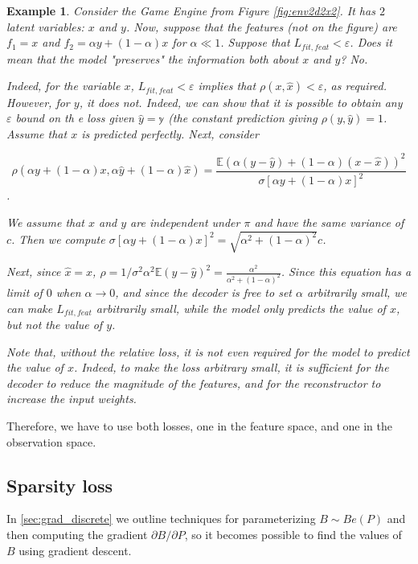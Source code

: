 \documentclass[a4paper,11pt,oneside]{report}
\newtheorem{example}{Example}[section]
\begin{document}
\begin{example}
Consider the Game Engine from Figure \ref{fig:env2d2x2}. It has $2$ latent variables: $x$ and $y$. Now, suppose that the features (not on the figure) are $f_1=x$ and $f_2=\alpha y+(1-\alpha)x$ for $\alpha \ll 1$. Suppose that $L_{fit, feat}<\varepsilon$. Does it mean that the model "preserves" the information both about $x$ and $y$? No.

Indeed, for the variable $x$, $L_{fit, feat}<\varepsilon$ implies that $\rho(x,\hat{x})<\varepsilon$, as required. However, for $y$, it does not. Indeed, we can show that it is possible to obtain any $\varepsilon$ bound on th e loss given $\hat{y}=\mathbb y$ (the constant prediction giving $\rho(y,\hat{y})=1$. Assume that $x$ is predicted perfectly. Next, consider

$$\rho(\alpha y+(1-\alpha)x,\alpha \hat{y}+(1-\alpha)\hat{x})=\frac{\mathbb E \left(\alpha(y-\hat{y})+(1-\alpha)(x-\hat{x})\right)^2}{\sigma[\alpha y+(1-\alpha)x]^2}$$.

We assume that $x$ and $y$ are independent under $\pi$ and have the same variance of $c$. Then we compute $\sigma[\alpha y+(1-\alpha)x]^2=\sqrt{\alpha^2+(1-\alpha)^2}c$.

Next, since $\hat{x}=x$, $\rho=1/\sigma^2\alpha^2\mathbb E(y-\hat{y})^2=\frac{\alpha^2}{\alpha^2+(1-\alpha)^2}$. Since this equation has a limit of $0$ when $\alpha\to 0$, and since the decoder is free to set $\alpha$ arbitrarily small, we can make $L_{fit, feat}$ arbitrarily small, while the model only predicts the value of $x$, but not the value of $y$.

Note that, without the relative loss, it is not even required for the model to predict the value of $x$. Indeed, to make the loss arbitrary small, it is sufficient for the decoder to reduce the magnitude of the features, and for the reconstructor to increase the input weights.
\end{example}

Therefore, we have to use both losses, one in the feature space, and one in the observation space.

\subsection{Sparsity loss}
In \autoref{sec:grad_discrete} we outline techniques for parameterizing $B\sim Be(P)$ and then computing the gradient $\partial B/\partial P$, so it becomes possible to find the values of $B$ using gradient descent.
\end{document}
